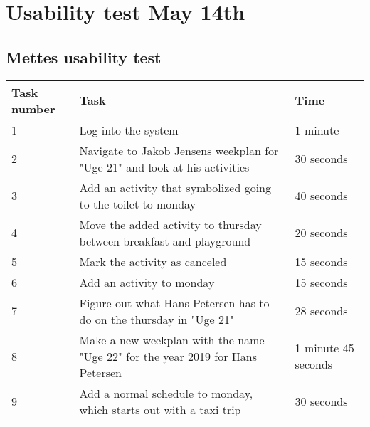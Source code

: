 \newpage
\section{Usability test May 14th}\label{usability-test-14-05}
\subsection{Mettes usability test}\label{usability-test-14-05-mette}
\begin{table}[H]
    \small
    \begin{tabular}{|p{1.3cm}|p{10cm}|p{1.7cm}|}
    \hline
    Task number  &Task                                                                                                                & Time      \\ \hline
    1 & Log into the system                                                                                                               & 1 minute  \\ \hline
    2 & Navigate to Jakob Jensens weekplan for "Uge 21" and look at his activities                                                     & 30 seconds  \\ \hline
    3 & Add an activity that symbolized going to the toilet to monday                                                                & 40 seconds               \\ \hline
    4 & Move the added activity to thursday between breakfast and playground                                                          & 20 seconds   \\ \hline
    5 & Mark the activity as canceled                                                                                                & 15 seconds     \\ \hline
    6 & Add an activity to monday                                                                                                     & 15 seconds     \\ \hline
    7 & Figure out what Hans Petersen has to do on the thursday in "Uge 21"                                                       & 28 seconds           \\ \hline
    8 & Make a new weekplan with the name "Uge 22" for the year 2019 for Hans Petersen                                                 & 1 minute 45 seconds        \\ \hline
    9 & Add a normal schedule to monday, which starts out with a taxi trip                                                     & 30 seconds                                                  \\ \hline

\end{tabular}
\end{table}

